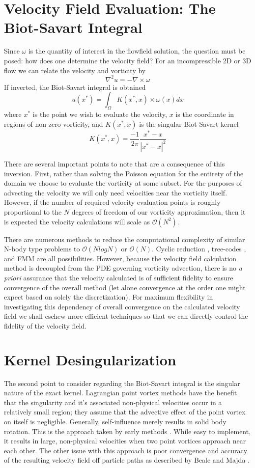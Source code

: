 \documentclass[letterpaper,12pt]{report}
\newcommand{\be}{\begin{equation}}
\newcommand{\ben}[1]{\begin{equation}\label{#1}}
\newcommand{\ee}{\end{equation}}
\begin{document}
\section{Velocity Field Evaluation: The Biot-Savart Integral}
Since $\omega$ is the quantity of interest in the flowfield solution, the question must be posed: how does one determine the velocity field? For an incompressible 2D or 3D flow we can relate the velocity and vorticity by
\be \nabla^2 u = -\nabla \times \omega \ee
If inverted, the Biot-Savart integral is obtained
\ben{BS} u(x^*) = \int_\Omega K(x^*,x) \times \omega(x) dx \ee
where $x^*$ is the point we wish to evaluate the velocity, $x$ is the coordinate in regions of non-zero vorticity, and $K(x^*,x)$ is the singular Biot-Savart kernel \cite{BealeMajda}
\ben{BSkern} K(x^*,x) = \frac{-1}{2 \pi} \frac{x^*-x}{|x^*-x|^2} \ee

There are several important points to note that are a consequence of this inversion. First, rather than solving the Poisson equation for the entirety of the domain we choose to evaluate the vorticity at some subset. For the purposes of advecting the velocity we will only need velocities near the vorticity itself. However, if the number of required velocity evaluation points is roughly proportional to the $N$ degrees of freedom of our vorticity approximation, then it is expected the velocity calculations will scale as $\mathcal{O}(N^2)$.

There are numerous methods to reduce the computational complexity of similar N-body type problems to $\mathcal{O}(NlogN)$ or $\mathcal{O}(N)$. Cyclic reduction \cite{SchumannSweet1976}, tree-codes \cite{LindsayKrasny2001,BarnesHut1986}, and FMM \cite{GreengardRokhlin1987} are all possibilities. However, because the velocity field calculation method is decoupled from the PDE governing vorticity advection, there is no \textit{a priori} assurance that the velocity calculated is of sufficient fidelity to ensure convergence of the overall method (let alone convergence at the order one might expect based on solely the discretization). For maximum flexibility in investigating this dependency of overall convergence on the calculated velocity field we shall eschew more efficient techniques so that we can directly control the fidelity of the velocity field.

\section{Kernel Desingularization} 
The second point to consider regarding the Biot-Savart integral is the singular nature of the exact kernel. Lagrangian point vortex methods have the benefit that the singularity and it's associated non-physical velocities occur in a relatively small region; they assume that the advective effect of the point vortex on itself is negligible. Generally, self-influence merely results in solid body rotation. This is the approach taken by early methods \cite{Point1}. While easy to implement, it results in large, non-physical velocities when two point vortices approach near each other. The other issue with this approach is poor convergence and accuracy of the resulting velocity field off particle paths as described by Beale and Majda \cite{BealeMajda}.
\end{document}
